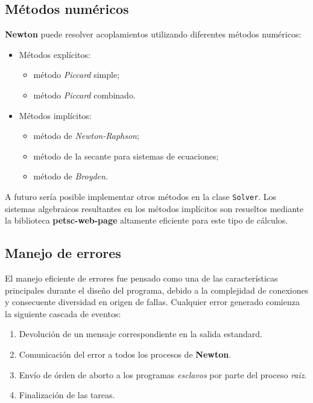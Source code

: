 \subsection*{Métodos numéricos}
\label{ap2:num-met}

\textbf{Newton} puede resolver acoplamientos utilizando diferentes métodos numéricos:
\begin{itemize}
\item Métodos explícitos:
\begin{itemize}
\item método \textit{Piccard} simple;
\item método \textit{Piccard} combinado.
\end{itemize}
\item Métodos implícitos:
\begin{itemize}
\item método de \textit{Newton-Raphson};
\item método de la secante para sistemas de ecuaciones;
\item método de \textit{Broyden}.
\end{itemize}
\end{itemize}
A futuro sería posible implementar otros métodos en la clase \texttt{Solver}.
Los sistemas algebraicos resultantes en los métodos implícitos son resueltos mediante la biblioteca \textbf{petsc-web-page} \cite{petsc-web-page} altamente eficiente para este tipo de cálculos.

\subsection*{Manejo de errores}
\label{ap2:error}

El manejo eficiente de errores fue pensado como una de las características principales durante el diseño del programa,
debido a la complejidad de conexiones y consecuente diversidad en origen de fallas.
Cualquier error generado comienza la siguiente cascada de eventos:
\begin{enumerate}
\item Devolución de un mensaje correspondiente en la salida estandard.
\item Comunicación del error a todos los procesos de \textbf{Newton}.
\item Envío de órden de aborto a los programas \textit{esclavos} por parte del proceso \textit{raiz}.
\item Finalización de las tareas.
\end{enumerate}

